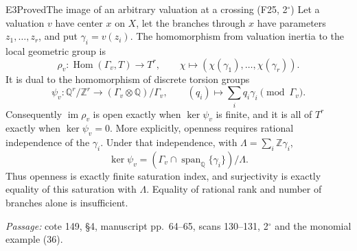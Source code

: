 \begin{result}{E3}{Proved}{The image of an arbitrary valuation at a crossing (F25, 2$^\circ$)}
Let a valuation $v$ have center $x$ on $X$, let the branches through $x$ have parameters $z_1,\ldots,z_r$, and put $\gamma_i=v(z_i)$. The homomorphism from valuation inertia to the local geometric group is
\[
 \rho_v:\operatorname{Hom}(\Gamma_v,T)\longrightarrow T^r,
 \qquad \chi\longmapsto(\chi(\gamma_1),\ldots,\chi(\gamma_r)).
\]
It is dual to the homomorphism of discrete torsion groups
\[
 \psi_v:\mathbb Q^r/\mathbb Z^r\longrightarrow
 (\Gamma_v\otimes\mathbb Q)/\Gamma_v,
 \qquad (q_i)\longmapsto\sum_iq_i\gamma_i\pmod{\Gamma_v}.
\]
Consequently $\operatorname{im}\rho_v$ is open exactly when $\ker\psi_v$ is finite, and it is all of $T^r$ exactly when $\ker\psi_v=0$. More explicitly, openness requires rational independence of the $\gamma_i$. Under that independence, with $\Lambda=\sum_i\mathbb Z\gamma_i$,
\[
 \ker\psi_v=(\Gamma_v\cap\operatorname{span}_{\mathbb Q}\{\gamma_i\})/\Lambda.
\]
Thus openness is exactly finite saturation index, and surjectivity is exactly equality of this saturation with $\Lambda$. Equality of rational rank and number of branches alone is insufficient.
\par\emph{Passage:} cote 149, \S4, manuscript pp.~64--65, scans 130--131, 2$^\circ$ and the monomial example (36).
\end{result}
